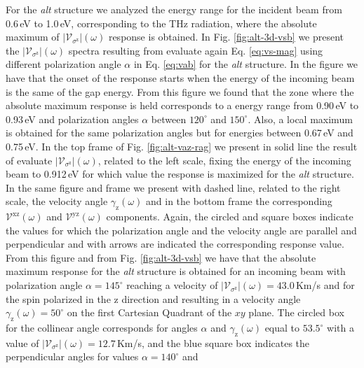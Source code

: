 \documentclass[prb,11pt,tightenlines,twocolumn,aps]{revtex4-1}
\begin{document}
For the \emph{alt} structure we analyzed the energy range for the incident beam from 0.6\,eV to 1.0\,eV, corresponding to the THz radiation, where the absolute maximum of $|\mathcal{V}_{\sigma^{\mathrm{z}}}|(\omega)$ response is obtained.
% 
In Fig. \ref{fig:alt-3d-vsb} we present the
$|\mathcal{V}_{\sigma^{\mathrm{z}}}|(\omega)$ spectra resulting from evaluate
again Eq. \eqref{eq:vs-mag} using different polarization angle $\alpha$ in Eq.
\eqref{eq:vab} for the \emph{alt} structure. In the figure we have that the
onset of the response starts when the energy of the incoming beam is the same of
the gap energy.
% 
From this figure we found that the zone where the absolute maximum response is
held corresponds to a energy range from 0.90\,eV to 0.93\,eV and polarization
angles $\alpha$ between $120^{\circ}$ and $150^{\circ}$. Also, a local maximum
is obtained for the same polarization angles but for energies between 0.67\,eV
and 0.75\,eV.
In the top frame of Fig. \ref{fig:alt-vaz-rag} we present in solid line the
result of evaluate $|\mathcal{V}_{\sigma^{\mathrm{z}}}|(\omega)$, related to the
left scale, fixing the energy of the incoming beam to 0.912\,eV for which value
the response is maximized for the \emph{alt} structure. In the same figure and
frame we present with dashed line, related to the right scale, the velocity
angle $\gamma_{\mathrm{z}}(\omega)$ and in the bottom frame the corresponding
$\mathcal{V}^{\mathrm{xz}}(\omega)$ and $\mathcal{V}^{\mathrm{yz}}(\omega)$
components. Again, the circled and square boxes indicate the values for which
the polarization angle and the velocity angle are parallel and perpendicular and
with arrows are indicated the corresponding response value.
% 
From this figure and from Fig. \ref{fig:alt-3d-vsb} we have that the absolute
maximum response for the \emph{alt} structure is obtained for an incoming beam
with polarization angle $\alpha=145^{\circ}$ reaching a velocity of
$|\mathcal{V}_{\sigma^{\mathrm{z}}}|(\omega)=43.0$\,Km/s and for the spin
polarized in the $\mathrm{z}$ direction and resulting in a velocity angle
$\gamma_{\mathrm{z}}(\omega)=50^{\circ}$ on the first Cartesian Quadrant of the
$xy$ plane. The circled box for the collinear angle corresponds for angles
$\alpha$ and $\gamma_{\mathrm{z}}(\omega)$ equal to $53.5^{\circ}$ with a value
of $|\mathcal{V}_{\sigma^{\mathrm{z}}}|(\omega)=12.7$\,Km/s, and the blue square
box indicates the perpendicular angles for values $\alpha=140^{\circ}$ and
\end{document}
